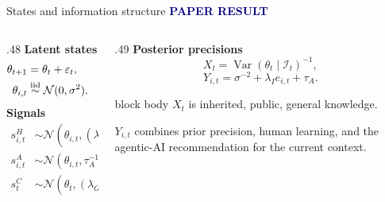 \documentclass[aspectratio=169,10pt]{beamer}
\newcommand{\paperlabel}{\textcolor{Navy}{\scriptsize\bfseries PAPER RESULT}}
\begin{document}
\begin{frame}{States and information structure}
  \paperlabel
  \vspace{.12cm}
  \begin{columns}[T,onlytextwidth]
    \begin{column}{.48\textwidth}
      \textbf{Latent states}
      \begin{align*}
        \theta_{t+1}&=\theta_t+\varepsilon_t,
        &\varepsilon_t&\sim\mathcal N(0,\Sigma^2),\\
        \theta_{i,t}&\overset{\rm iid}{\sim}\mathcal N(0,\sigma^2).
      \end{align*}
      \textbf{Signals}
      \begin{align*}
        s^H_{i,t}&\sim\mathcal N\!\left(\theta_{i,t},(\lambda_Ie_{i,t})^{-1}\right),\\
        s^A_{i,t}&\sim\mathcal N\!\left(\theta_{i,t},\tau_A^{-1}\right),\\
        s^C_t&\sim\mathcal N\!\left(\theta_t,(\lambda_G I e_t)^{-1}\right).
      \end{align*}
    \end{column}
    \begin{column}{.49\textwidth}
      \textbf{Posterior precisions}
      \[
        X_t=\operatorname{Var}(\theta_t\mid\mathcal I_t)^{-1},
      \]
      \[
        \boxed{Y_{i,t}=\sigma^{-2}+\lambda_Ie_{i,t}+\tau_A}.
      \]
      \begin{beamercolorbox}[rounded=true,sep=.65em]{block body}
      \small
      $X_t$ is inherited, public, general knowledge.\par\medskip
      $Y_{i,t}$ combines prior precision, human learning, and the agentic-AI
      recommendation for the current context.
      \end{beamercolorbox}
    \end{column}
  \end{columns}
\end{frame}
\end{document}
